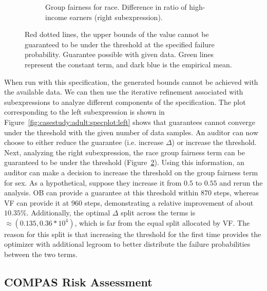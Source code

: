 \begin{figure}
\begin{subfigure}{0.6\linewidth}
    \caption{Group fairness for race. Difference in ratio of high-income earners (right subexpression). }
    \label{fig:casestudy:adult:specplot:right}
    \end{subfigure}
    \caption{\figtop{} Red dotted lines, the upper bounds of the value cannot be guaranteed to be under the threshold at the specified failure probability. \figbottom{} Guarantee possible with given data. Green lines represent the constant term, and dark blue is the empirical mean.}
\end{figure}
When run with this specification, the generated bounds cannot be achieved with the available data. 
We can then use the iterative refinement associated with subexpressions to analyze different components of the specification. 
The plot corresponding to the left subexpression is shown in Figure~\ref{fig:casestudy:adult:specplot:left} shows that guarantees cannot converge under the threshold with the given number of data samples. 
An auditor can now choose to either reduce the guarantee (i.e. increase $\Delta$) or increase the threshold. 
Next, analyzing the right subexpression, the race group fairness term can be guaranteed to be under the threshold (Figure~\ref{fig:casestudy:adult:specplot:right}).
Using this information, an auditor can make a decision to increase the threshold on the group fairness term for sex. 
As a hypothetical, suppose they increase it from $0.5$ to $0.55$ and rerun the analysis.
OB can provide a guarantee at this threshold within 870 steps, whereas VF can provide it at 960 steps, demonstrating a relative improvement of about $\mathbf{10.35\%}$.
Additionally, the optimal $\Delta$ split across the terms is $\approx (0.135, 0.36 * 10^4)$, which is far from the equal split allocated by VF.
The reason for this split is that increasing the threshold for the first time provides the optimizer with additional legroom to better distribute the failure probabilities between the two terms.

\subsection{COMPAS Risk Assessment}

